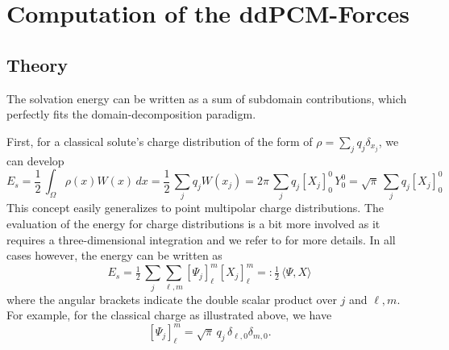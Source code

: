 \section{Computation of the ddPCM-Forces}\label{sec:forces}

\subsection{Theory}
The solvation energy can be written as a sum of subdomain contributions, which perfectly fits the domain-decomposition paradigm. 

First, for a classical solute's charge distribution of the form of $\rho=\sum_j q_j \delta_{x_j}$, we can develop
\[
	E_s 
	= \frac{1}{2} \,  \int_{\Omega} \rho(x) W(x) \, dx
	= \frac{1}{2} \, \sum_j q_j  W(x_j)
	= 2 \pi \, \sum_j q_j [X_j]_0^0    \, Y_0^0
	= {\sqrt{\pi}}\, \sum_j q_j [X_j]_0^0
\]
This concept easily generalizes to point multipolar charge distributions. 
The evaluation of the energy for charge distributions is a bit more involved as it requires a three-dimensional integration and we refer to \cite{Lipparini_JCP_ddCOSMO-QM} for more details. In all cases however, the energy can be written as
\[
E_s = \tfrac{1}{2}
 \, \sum_j \sum_{\ell,m} [\Psi_j]_\ell^m [X_j]_\ell^m
  =: \tfrac{1}{2} 
  \,\langle \Psi, X \rangle
\]
where the angular brackets indicate the double scalar product over $j$ and $\ell,m$.
For example, for the classical charge as illustrated above, we have 
\[
	[\Psi_j]_\ell^m = {\sqrt{\pi}}\, q_j \, \delta_{\ell,0} \delta_{m,0}.
\]


